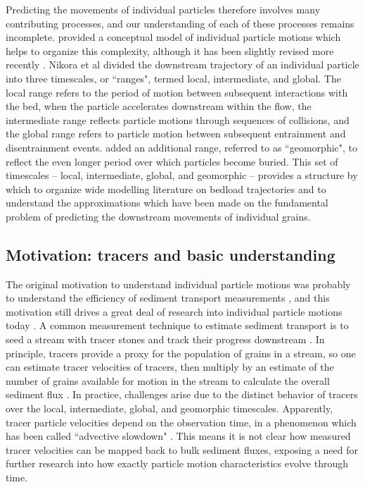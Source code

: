 Predicting the movements of individual particles therefore involves many contributing processes, and our understanding of each of these processes remains incomplete.
\citet{Nikora2001,Nikora2002} provided a conceptual model of individual particle motions which helps to organize this complexity, although it has been slightly revised more recently \citep{Campagnol2013, Hassan2017, Pierce2020}.
Nikora et al divided the downstream trajectory of an individual particle into three timescales, or ``ranges", termed local, intermediate, and global.
The local range refers to the period of motion between subsequent interactions with the bed, when the particle accelerates downstream within the flow, the intermediate range reflects particle motions through sequences of collisions, and the global range refers to particle motion between subsequent entrainment and disentrainment events.
\citet{Hassan2017} added an additional range, referred to as ``geomorphic", to reflect the even longer period over which particles become buried. 
This set of timescales -- local, intermediate, global, and geomorphic -- provides a structure by which to organize wide modelling literature on bedload trajectories and to understand the approximations which have been made on the fundamental problem of predicting the downstream movements of individual grains.


\subsection{Motivation: tracers and basic understanding}
The original motivation to understand individual particle motions was probably to understand the efficiency of sediment transport measurements \citep{Ettema2004}, and this motivation still drives a great deal of research into individual particle motions today \citep{Hassan2017,Pretzlav2021}.
A common measurement technique to estimate sediment transport is to seed a stream with tracer stones and track their progress downstream \citep{Einstein1937, Takayama1966, Ashmore2020}.
In principle, tracers provide a proxy for the population of grains in a stream, so one can estimate tracer velocities of tracers, then multiply by an estimate of the number of grains available for motion in the stream to calculate the overall sediment flux \citep{Yano1969,Nakagawa1976,Hassan2017}.
In practice, challenges arise due to the distinct behavior of tracers over the local, intermediate, global, and geomorphic timescales. Apparently, tracer particle velocities depend on the observation time, in a phenomenon which has been called ``advective slowdown" \citep{Ferguson2002,Haschenberger2012}. This means it is not clear how measured tracer velocities can be mapped back to bulk sediment fluxes, exposing a need for further research into how exactly particle motion characteristics evolve through time.

